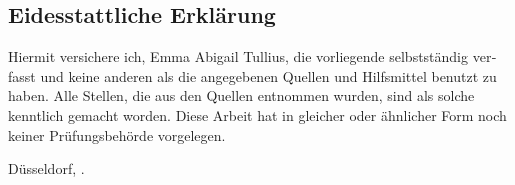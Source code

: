 \begin{otherlanguage}{ngerman}

\chapter*{Eidesstattliche Erklärung}

Hiermit versichere ich, Emma Abigail Tullius, die vorliegende \thesistypegerman{} selbstständig verfasst und keine anderen als die angegebenen Quellen und Hilfsmittel benutzt zu haben.
Alle Stellen, die aus den Quellen entnommen wurden, sind als solche kenntlich gemacht worden.
Diese Arbeit hat in gleicher oder ähnlicher Form noch keiner Prüfungsbehörde vorgelegen.

\vspace{3cm}

\noindent Düsseldorf, \thesissubmissionday{}. \DTMmonthname{\thesissubmissionmonth} \thesissubmissionyear{} \hfill \makeatletter\@author\makeatother

\end{otherlanguage}

